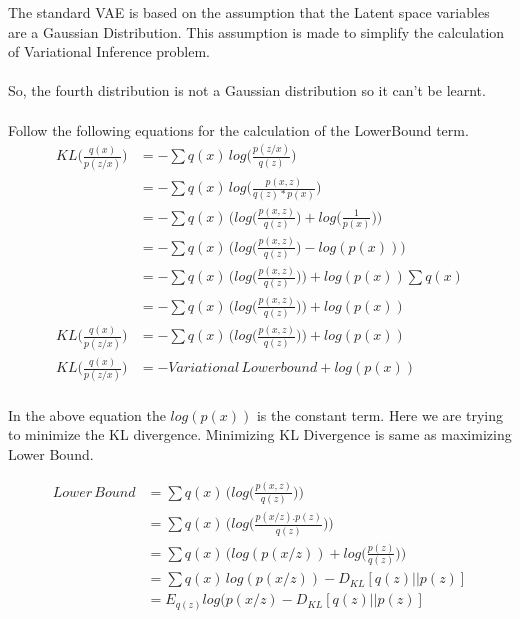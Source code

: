 The standard VAE is based on the assumption that the Latent space variables are a Gaussian Distribution. This assumption is made to simplify the calculation of Variational Inference problem. 
\\ \\
So, the fourth distribution is not a Gaussian distribution so it can't be learnt. 
\\ \\
Follow the following equations for the calculation of the LowerBound term. 
\begin{equation*}
\begin{split}
    KL\Big(\frac{q(x)}{p(z/x)}\Big) &= -\sum q(x) \, log\Big(\frac{p(z/x)}{q(z)}\Big)\\
    &= -\sum q(x) \, log\Big(\frac{p(x,z)}{q(z)*p(x)}\Big)\\
    &= -\sum q(x) \, \Big(log\Big(\frac{p(x,z)}{q(z)}\Big) + log\Big(\frac{1}{p(x)}\Big)\Big)\\
    &= -\sum q(x) \, \Big(log\Big(\frac{p(x,z)}{q(z)}\Big) - log(p(x))\Big)\\
    &= -\sum q(x) \, \Big(log\Big(\frac{p(x,z)}{q(z)}\Big)\Big) + log(p(x)) \sum q(x)\\
    &= -\sum q(x) \, \Big(log\Big(\frac{p(x,z)}{q(z)}\Big)\Big) + log(p(x))\\
    KL\Big(\frac{q(x)}{p(z/x)}\Big) &= -\sum q(x) \, \Big(log\Big(\frac{p(x,z)}{q(z)}\Big)\Big) + log(p(x))\\
    KL\Big(\frac{q(x)}{p(z/x)}\Big) &= -Variational \, Lowerbound + log(p(x))\\
\end{split}
\end{equation*}

In the above equation the $log(p(x))$ is the constant term. Here we are trying to minimize the KL divergence. Minimizing KL Divergence is same as maximizing Lower Bound. 

\begin{equation*}
\begin{split}
    Lower \, Bound &= \sum q(x) \, \Big(log\Big(\frac{p(x,z)}{q(z)}\Big)\Big)\\
    &= \sum q(x) \, \Big(log\Big(\frac{p(x/z).p(z)}{q(z)}\Big)\Big)\\
    &= \sum q(x) \, \Big(log(p(x/z)) + log\Big(\frac{p(z)}{q(z)}\Big)\Big)\\
    &= \sum q(x) \, log(p(x/z)) - D_{KL}[q(z)||p(z)]\\
    &= E_{q(z)}log(p(x/z) - D_{KL}[q(z)||p(z)]\\ \\
\end{split}
\end{equation*}

